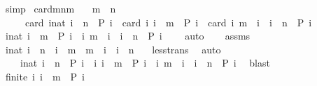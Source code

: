 \begin{isabellebody}
\ simp\isanewline
{}\isamarkupfalse%
%
\endisatagproof
{\isafoldproof}%
%
\isadelimproof
\isanewline
%
\endisadelimproof
\isanewline
{}\isamarkupfalse%
\ card{\isacharunderscore}mnm{\isacharcolon}\isanewline
\ \ \ {\isacartoucheopen}m\ {\isacharless}\ n{\isacartoucheclose}\isanewline
\ \ \ \ \ {\isacartoucheopen}card\ {\isacharbraceleft}i{\isacharcolon}{\isacharcolon}nat{\isachardot}\ i\ {\isacharless}\ n\ {\isasymand}\ P\ i{\isacharbraceright}\ {\isacharequal}\ card\ {\isacharbraceleft}i{\isachardot}\ i\ {\isasymle}\ m\ {\isasymand}\ P\ i{\isacharbraceright}\ {\isacharplus}\ card\ {\isacharbraceleft}i{\isachardot}\ m\ {\isacharless}\ i\ {\isasymand}\ i\ {\isacharless}\ n\ {\isasymand}\ P\ i{\isacharbraceright}{\isacartoucheclose}\isanewline
%
\isadelimproof
%
\endisadelimproof
%
\isatagproof
{}\isamarkupfalse%
\ {\isacharminus}\isanewline
\ \ \isamarkupfalse%
\ {}{\isacharcolon}{\isacartoucheopen}{\isacharbraceleft}i{\isacharcolon}{\isacharcolon}nat{\isachardot}\ i\ {\isasymle}\ m\ {\isasymand}\ P\ i{\isacharbraceright}\ {\isasyminter}\ {\isacharbraceleft}i{\isachardot}\ m\ {\isacharless}\ i\ {\isasymand}\ i\ {\isacharless}\ n\ {\isasymand}\ P\ i{\isacharbraceright}\ {\isacharequal}\ {\isacharbraceleft}{\isacharbraceright}{\isacartoucheclose}\ \isamarkupfalse%
\ auto\isanewline
\ \ \isamarkupfalse%
\ assms\ \isamarkupfalse%
\ {\isacartoucheopen}{\isasymforall}i{\isacharcolon}{\isacharcolon}nat{\isachardot}\ i\ {\isacharless}\ n\ {\isacharequal}\ {\isacharparenleft}i\ {\isasymle}\ m{\isacharparenright}\ {\isasymor}\ {\isacharparenleft}m\ {\isacharless}\ i\ {\isasymand}\ i\ {\isacharless}\ n{\isacharparenright}{\isacartoucheclose}\ \ \isamarkupfalse%
\ less{\isacharunderscore}trans\ \isamarkupfalse%
\ auto\isanewline
\ \ \isamarkupfalse%
\ {}{\isacharcolon}\isanewline
\ \ \ \ {\isacartoucheopen}{\isacharbraceleft}i{\isacharcolon}{\isacharcolon}nat{\isachardot}\ i\ {\isacharless}\ n\ {\isasymand}\ P\ i{\isacharbraceright}\ {\isacharequal}\ {\isacharbraceleft}i{\isachardot}\ i\ {\isasymle}\ m\ {\isasymand}\ P\ i{\isacharbraceright}\ {\isasymunion}\ {\isacharbraceleft}i{\isachardot}\ m\ {\isacharless}\ i\ {\isasymand}\ i\ {\isacharless}\ n\ {\isasymand}\ P\ i{\isacharbraceright}{\isacartoucheclose}\ \isamarkupfalse%
\ blast\isanewline
\ \ \isamarkupfalse%
\ {}{\isacharcolon}{\isacartoucheopen}finite\ {\isacharbraceleft}i{\isachardot}\ i\ {\isasymle}\ m\ {\isasymand}\ P\ i{\isacharbraceright}{\isacartoucheclose}\ \isamarkupfalse%

\end{isabellebody}
